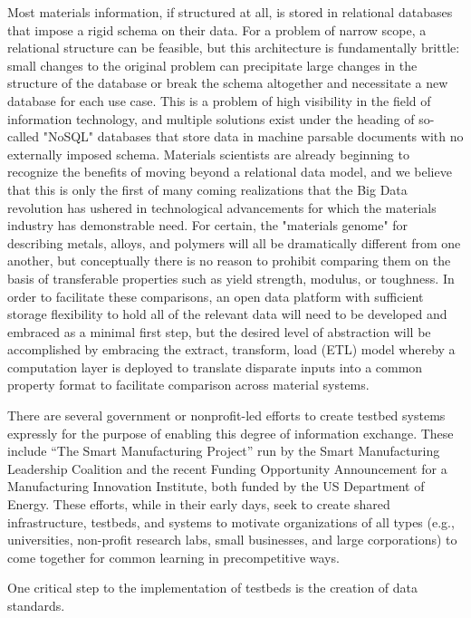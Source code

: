 Most materials information, if structured at all, is stored in relational databases that impose a rigid schema on their data. 
For a problem of narrow scope, a relational structure can be feasible, but this architecture is fundamentally brittle: small changes to the original problem can precipitate large changes in the structure of the database or break the schema altogether and necessitate a new database for each use case.
This is a problem of high visibility in the field of information technology, and multiple solutions exist under the heading of so-called "NoSQL" databases that store data in machine parsable documents with no externally imposed schema\cite{Han2011,Kaur2013}. Materials scientists are already beginning to recognize the benefits of moving beyond a relational data model\cite{Blair2014}, and we believe that this is only the first of many coming realizations that the Big Data revolution has ushered in technological advancements for which the materials industry has demonstrable need.
For certain, the "materials genome" for describing metals, alloys, and polymers will all be dramatically different from one another, but conceptually there is no reason to prohibit comparing them on the basis of transferable properties such as yield strength, modulus, or toughness. 
In order to facilitate these comparisons, an open data platform with sufficient storage flexibility to hold all of the relevant data will need to be developed and embraced as a minimal first step, but the desired level of abstraction will be accomplished by embracing the extract, transform, load (ETL) model whereby a computation layer is deployed to translate disparate inputs into a common property format to facilitate comparison across material systems.

There are several government or nonprofit-led efforts to create testbed systems expressly for the purpose of enabling this degree of information exchange. These include ``The Smart Manufacturing Project'' run by the Smart Manufacturing Leadership Coalition and the recent Funding Opportunity Announcement for a Manufacturing Innovation Institute, both funded by the US Department of Energy\cite{SmartManufacturingLeadershipCoalition2013,EERE-MII}. These efforts, while in their early days, seek to create shared infrastructure, testbeds, and systems to motivate organizations of all types (e.g., universities, non-profit research labs, small businesses, and large corporations) to come together for common learning in precompetitive ways. 

One critical step to the implementation of testbeds is the creation of data standards. 

